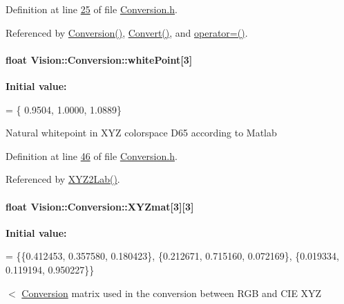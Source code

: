 Definition at line \hyperlink{_conversion_8h_source_l00025}{25} of file \hyperlink{_conversion_8h_source}{Conversion.\+h}.



Referenced by \hyperlink{_conversion_8cpp_source_l00014}{Conversion()}, \hyperlink{_conversion_8cpp_source_l00086}{Convert()}, and \hyperlink{_conversion_8cpp_source_l00041}{operator=()}.

\hypertarget{class_vision_1_1_conversion_adbaed406827f7ffb583d003815a9f3f8}{}
\paragraph[{white\+Point}]{\setlength{\rightskip}{0pt plus 5cm}float Vision\+::\+Conversion\+::white\+Point\mbox{[}3\mbox{]}\hspace{0.3cm}{\ttfamily [private]}}\label{class_vision_1_1_conversion_adbaed406827f7ffb583d003815a9f3f8}
{\bfseries Initial value\+:}
\begin{DoxyCode}
= \{
      0.9504, 1.0000, 1.0889\}
\end{DoxyCode}
Natural whitepoint in X\+Y\+Z colorspace D65 according to Matlab 

Definition at line \hyperlink{_conversion_8h_source_l00046}{46} of file \hyperlink{_conversion_8h_source}{Conversion.\+h}.



Referenced by \hyperlink{_conversion_8cpp_source_l00225}{X\+Y\+Z2\+Lab()}.

\hypertarget{class_vision_1_1_conversion_ad0c6e6c63380927c63da7f967b5e61d1}{}
\paragraph[{X\+Y\+Zmat}]{\setlength{\rightskip}{0pt plus 5cm}float Vision\+::\+Conversion\+::\+X\+Y\+Zmat\mbox{[}3\mbox{]}\mbox{[}3\mbox{]}\hspace{0.3cm}{\ttfamily [private]}}\label{class_vision_1_1_conversion_ad0c6e6c63380927c63da7f967b5e61d1}
{\bfseries Initial value\+:}
\begin{DoxyCode}
= \{\{0.412453, 0.357580, 0.180423\},
                        \{0.212671, 0.715160, 0.072169\},
                        \{0.019334, 0.119194, 0.950227\}\}
\end{DoxyCode}
$<$ \hyperlink{class_vision_1_1_conversion}{Conversion} matrix used in the conversion between R\+G\+B and C\+I\+E X\+Y\+Z 


